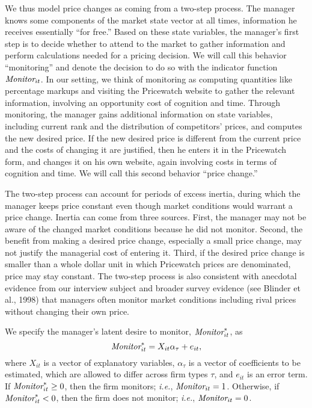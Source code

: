 \documentclass[11pt]{article}
\newcommand{\Monitor}{\mbox{\it Monitor}}
\begin{document}
\begin{spacing}{1.3}
We thus model price changes as coming from a two-step process. The
manager knows some components of the market state vector at all times,
information he receives essentially ``for free.''  Based on these
state variables, the manager's first step is to decide whether to
attend to the market to gather information and perform calculations
needed for a pricing decision. We will call this behavior
``monitoring'' and denote the decision to do so with the indicator
function $\Monitor_{it}$.  In our setting, we think of monitoring as
computing quantities like percentage markups and visiting the
Pricewatch website to gather the relevant information, involving an
opportunity cost of cognition and time. Through monitoring, the
manager gains additional information on state variables, including
current rank and the distribution of competitors' prices, and computes
the new desired price. If the new desired price is different from the
current price and the costs of changing it are justified, then he
enters it in the Pricewatch form, and changes it on his own website,
again involving costs in terms of cognition and time. We will call this
second behavior ``price change.''

The two-step process can account for periods of excess inertia, during
which the manager keeps price constant even though market conditions
would warrant a price change. Inertia can come from three
sources. First, the manager may not be aware of the changed market
conditions because he did not monitor. Second, the benefit from making
a desired price change, especially a small price change, may not
justify the managerial cost of entering it. Third, if the desired
price change is smaller than a whole dollar unit in which Pricewatch
prices are denominated, price may stay constant. The two-step process
is also consistent with anecdotal evidence from our interview subject
and broader survey evidence (see Blinder et al., 1998) that managers
often monitor market conditions including rival prices without
changing their own price.

We specify the manager's latent desire to monitor, $\Monitor^*_{it}$,
as
\begin{equation}
\label{monitoring}
\Monitor_{it}^* = X_{it} \alpha_{\tau} + e_{it},
\end{equation}
where $X_{it}$ is a vector of explanatory variables, $\alpha_{\tau}$
is a vector of coefficients to be estimated, which are allowed to
differ across firm types $\tau$, and $e_{it}$ is an error term. If
$\Monitor^*_{it} \geq 0$, then the firm monitors; {\it i.e.},
$\Monitor_{it} = 1$. Otherwise, if $\Monitor^*_{it} < 0$, then the
firm does not monitor; {\it i.e.}, $\Monitor_{it} = 0$.


\end{spacing}
\end{document}
